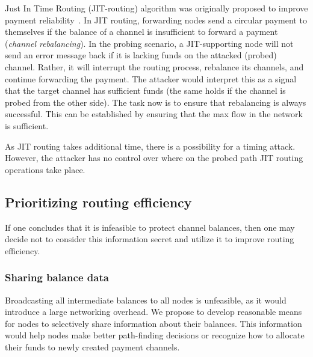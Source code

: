 Just In Time Routing (JIT-routing) algorithm was originally proposed to improve payment reliability~\cite{Pickhardt2019, Pickhardt2019a}.
In JIT routing, forwarding nodes send a circular payment to themselves if the balance of a channel is insufficient to forward a payment (\textit{channel rebalancing}).
In the probing scenario, a JIT-supporting node will not send an error message back if it is lacking funds on the attacked (probed) channel.
Rather, it will interrupt the routing process, rebalance its channels, and continue forwarding the payment.
The attacker would interpret this as a signal that the target channel has sufficient funds (the same holds if the channel is probed from the other side).
The task now is to ensure that rebalancing is always successful.
This can be established by ensuring that the max flow in the network is sufficient.

As JIT routing takes additional time, there is a possibility for a timing attack. 
However, the attacker has no control over where on the probed path JIT routing operations take place. 


\subsection{Prioritizing routing efficiency}

If one concludes that it is infeasible to protect channel balances, then one may decide not to consider this information secret and utilize it to improve routing efficiency.

\subsubsection*{Sharing balance data}

Broadcasting all intermediate balances to all nodes is unfeasible, as it would introduce a large networking overhead.
We propose to develop reasonable means for nodes to selectively share information about their balances.
This information would help nodes make better path-finding decisions or recognize how to allocate their funds to newly created payment channels.

